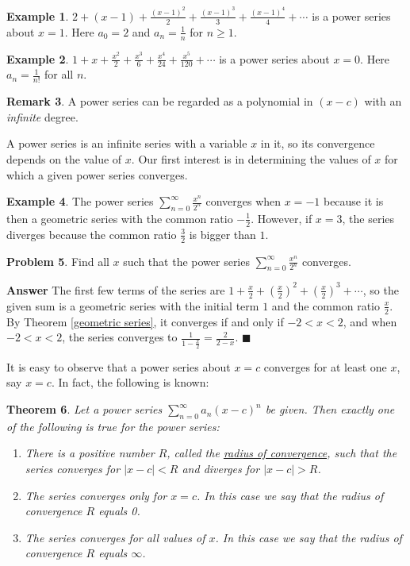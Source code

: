 \documentclass[12pt,letterpaper]{book}
\numberwithin{equation}{section}
\newtheorem{thm}{\textbf{Theorem}}[section]
\theoremstyle{definition}
\newtheorem{problem}[thm]{\textbf{Problem}}
\newtheorem{example}[thm]{\textbf{Example}}
\newtheorem{remark}[thm]{\textbf{Remark}}
\newenvironment{answer}{\noindent\textbf{Answer}}{\hfill$\blacksquare$\vspace{0.1in}}
\begin{document}
\begin{example} $2+(x-1)+\frac{(x-1)^2}{2}+\frac{(x-1)^3}{3}+\frac{(x-1)^4}{4}+\cdots$ is a power series about $x=1$. Here $a_0=2$ and $a_n=\frac{1}{n}$ for $n\geq 1$.
\end{example}

\begin{example} $1+x+\frac{x^2}{2}+\frac{x^3}{6}+\frac{x^4}{24}+\frac{x^5}{120}+\cdots$ is a power series about $x=0$. Here $a_n=\frac{1}{n!}$ for all $n$.
\end{example}

\begin{remark} A power series can be regarded as a polynomial in $(x-c)$ with an \textit{infinite} degree.
\end{remark}

A power series is an infinite series with a variable $x$ in it, so its convergence depends on the value of $x$. Our first interest is in determining the values of $x$ for which a given power series converges.

\begin{example} The power series $\displaystyle{\sum_{n=0}^\infty \frac{x^n}{2^n}}$ converges when $x=-1$ because it is then a geometric series with the common ratio $-\frac{1}{2}$. However, if $x=3$, the series diverges because the common ratio $\frac{3}{2}$ is bigger than $1$.
\end{example}

\begin{problem}\label{firstpower} Find all $x$ such that the power series $\displaystyle{\sum_{n=0}^\infty \frac{x^n}{2^n}}$ converges.
\end{problem}

\begin{answer}
The first few terms of the series are $1+\frac{x}{2}+(\frac{x}{2})^2+(\frac{x}{2})^3+\cdots$, so the given sum is a geometric series with the initial term $1$ and the common ratio $\frac{x}{2}$. By Theorem \ref{geometric series}, it converges if and only if $-2<x<2$, and when $-2<x<2$, the series converges to $\frac{1}{1-\frac{x}{2}}=\frac{2}{2-x}$.
\end{answer}

It is easy to observe that a power series about $x=c$ converges for at least one $x$, say $x=c$. In fact, the following is known:

\begin{thm} Let a power series $\displaystyle{\sum_{n=0}^\infty a_n(x-c)^n}$ be given. Then exactly one of the following is true for the power series:
\begin{enumerate}
\item There is a positive number $R$, called the \underline{radius of convergence}, such that the series converges for $|x-c|<R$ and diverges for $|x-c|>R$.
\item The series converges only for $x=c$. In this case we say that the radius of convergence $R$ equals 0.
\item The series converges for all values of $x$. In this case we say that the radius of convergence $R$ equals $\infty$.
\end{enumerate}
\end{thm}
\end{document}
